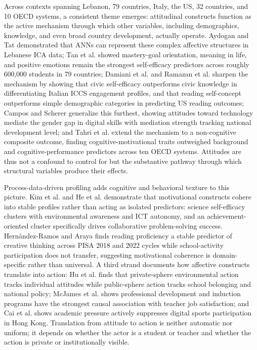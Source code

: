 \documentclass{ieeeaccess}
\begin{document}
Across contexts spanning Lebanon, 79 countries, Italy, the US, 32 countries, and 10 OECD systems, a consistent theme emerges: attitudinal constructs function as the active mechanism through which other variables, including demographics, knowledge, and even broad country development, actually operate. Aydogan and Tat \cite{aydogan-tat2024} demonstrated that ANNs can represent these complex affective structures in Lebanese ICA data; Tan et al. \cite{tan-etal2025} showed mastery-goal orientation, meaning in life, and positive emotions remain the strongest self-efficacy predictors across roughly 600,000 students in 79 countries; Damiani et al. \cite{damianiYoungPeoplesCivic2024} and Ramazan et al. \cite{ramazan-etal2023} sharpen the mechanism by showing that civic self-efficacy outperforms civic knowledge in differentiating Italian ICCS engagement profiles, and that reading self-concept outperforms simple demographic categories in predicting US reading outcomes; Campos and Scherer \cite{camposDigitalGenderGaps2024} generalize this furthest, showing attitudes toward technology mediate the gender gap in digital skills with mediation strength tracking national development level; and Tahri et al. \cite{tahriMLApplicationsPredictin2026} extend the mechanism to a non-cognitive composite outcome, finding cognitive-motivational traits outweighed background and cognitive-performance predictors across ten OECD systems. Attitudes are thus not a confound to control for but the substantive pathway through which structural variables produce their effects.

Process-data-driven profiling adds cognitive and behavioral texture to this picture. Kim et al. \cite{kim-etal2024} and He et al. \cite{he-etal2024} demonstrate that motivational constructs cohere into stable profiles rather than acting as isolated predictors: science self-efficacy clusters with environmental awareness and ICT autonomy, and an achievement-oriented cluster specifically drives collaborative problem-solving success. Hern\'{a}ndez-Ramos and Araya \cite{hernandez-ramos-araya2025} finds reading proficiency a stable predictor of creative thinking across PISA 2018 and 2022 cycles while school-activity participation does not transfer, suggesting motivational coherence is domain-specific rather than universal. A third strand documents how affective constructs translate into action: Hu et al. \cite{hu-etal-Predicting-Adolescents-2025} finds that private-sphere environmental action tracks individual attitudes while public-sphere action tracks school belonging and national policy; McJames et al. \cite{mcjames-etal2023} shows professional development and induction programs have the strongest causal association with teacher job satisfaction; and Cai et al. \cite{cai-etal2025} shows academic pressure actively suppresses digital sports participation in Hong Kong. Translation from attitude to action is neither automatic nor uniform; it depends on whether the actor is a student or teacher and whether the action is private or institutionally visible.
\end{document}
